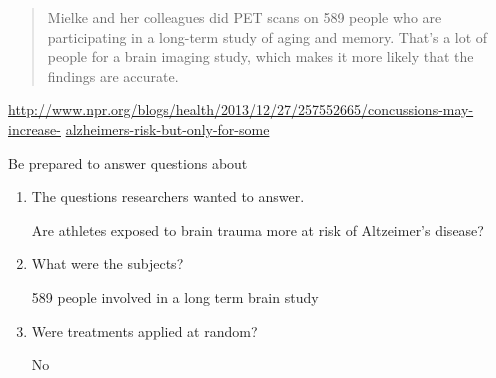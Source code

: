 \begin{enumerate}
{\begin{quotation}
Mielke and her colleagues did PET scans on 589 people who are
participating in a long-term study of aging and memory. That's a lot
of people for a brain imaging study, which makes it more likely that
the findings are accurate. 
  \end{quotation}
}
\url{http://www.npr.org/blogs/health/2013/12/27/257552665/concussions-may-increase-}
\url{alzheimers-risk-but-only-for-some}

 Be prepared to answer questions about 
\begin{enumerate}
\item  The questions researchers wanted to answer.
\begin{students}
 \vspace{1in}
\end{students}

\begin{key}
  Are athletes exposed to brain trauma more at risk of Altzeimer's disease?
\end{key}


\item What were the subjects?
\begin{students}
 \vspace{1cm}
\end{students}

\begin{key}
 589 people involved in a long term brain study
\end{key}



\item Were treatments applied at random?
\begin{students}
 \vspace{1cm}
\end{students}

\begin{key}
No
\end{key}

\end{enumerate}
\end{enumerate}


